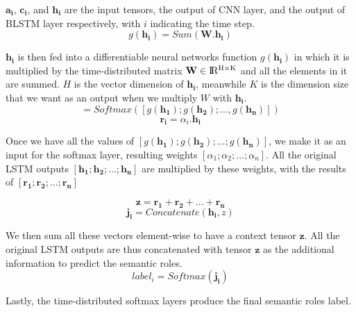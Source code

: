 $\mathbf{a_{i}}$, $\mathbf{c_{i}}$, and $\mathbf{h_{i}}$ are the input tensors, the output of CNN layer, and the output of BLSTM layer respectively, with $i$ indicating the time step. 
\begin{equation}
\label{sum_weight}
g(\mathbf{h_{i}}) = Sum(\mathbf{W}.\mathbf{h_{i}})
\end{equation}

$\mathbf{h_{i}}$ is then fed into a differentiable neural networks function $g(\mathbf{h_{i}})$ in which it is multiplied by the time-distributed matrix $\textbf{W} \in {\rm I\!R^{H \times K}}$ and all the elements in it are summed. $H$ is the vector dimension of $\mathbf{h_{i}}$, meanwhile $K$ is the dimension size that we want as an output when we multiply \textbf{$W$} with $\mathbf{h_{i}}$.
\begin{equation}
[\alpha_{1}, \alpha_{2}, ..., \alpha_{n}] = Softmax([g(\mathbf{h_{1}}); g(\mathbf{h_{2}}); ..., g(\mathbf{h_{n}})])
\end{equation}
\begin{equation}
\mathbf{r_{i}} = \alpha_{i}.\mathbf{h_{i}}
\end{equation}

Once we have all the values of $[g(\mathbf{h_{1}}); g(\mathbf{h_{2}}); ...; g(\mathbf{h_{n}})]$, we make it as an input for the softmax layer, resulting weights $[\alpha_{1}; \alpha_{2}; ...; \alpha_{n}]$. All the original LSTM outputs $[\mathbf{h_{1}}; \mathbf{h_{2}}; ...; \mathbf{h_{n}}]$ are multiplied by these weights, with the results of $[\mathbf{r_{1}}; \mathbf{r_{2}}; ...; \mathbf{r_{n}}]$


\begin{equation}
\mathbf{z} = \mathbf{r_{1}} + \mathbf{r_{2}} + ... + \mathbf{r_{n}}
\end{equation}
\begin{equation}
\mathbf{j_{i}} = Concatenate(\mathbf{h_{i}}, z)
\end{equation}

We then sum all these vectors element-wise to have a context tensor $\mathbf{z}$. 
All the original LSTM outputs are thus concatenated with tensor $\mathbf{z}$ as the additional information to predict the semantic roles.
\begin{equation}
label_{i} = Softmax(\mathbf{j_{i}})
\end{equation}

Lastly, the time-distributed softmax layers produce the final semantic roles label.


